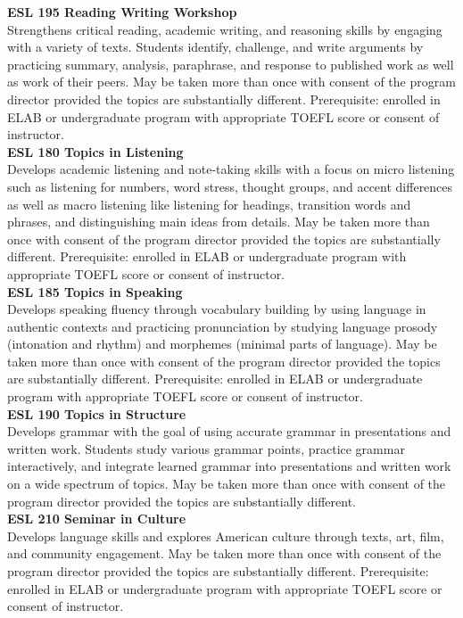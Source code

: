 \documentclass[
  letterpaper,
]{scrbook}
\begin{document}
\textbf{ESL 195 Reading Writing Workshop}\\
Strengthens critical reading, academic writing, and reasoning skills by
engaging with a variety of texts. Students identify, challenge, and
write arguments by practicing summary, analysis, paraphrase, and
response to published work as well as work of their peers. May be taken
more than once with consent of the program director provided the topics
are substantially different. Prerequisite: enrolled in ELAB or
undergraduate program with appropriate TOEFL score or consent of
instructor.\\
\textbf{ESL 180 Topics in Listening}\\
Develops academic listening and note-taking skills with a focus on micro
listening such as listening for numbers, word stress, thought groups,
and accent differences as well as macro listening like listening for
headings, transition words and phrases, and distinguishing main ideas
from details. May be taken more than once with consent of the program
director provided the topics are substantially different. Prerequisite:
enrolled in ELAB or undergraduate program with appropriate TOEFL score
or consent of instructor.\\
\textbf{ESL 185 Topics in Speaking}\\
Develops speaking fluency through vocabulary building by using language
in authentic contexts and practicing pronunciation by studying language
prosody (intonation and rhythm) and morphemes (minimal parts of
language). May be taken more than once with consent of the program
director provided the topics are substantially different. Prerequisite:
enrolled in ELAB or undergraduate program with appropriate TOEFL score
or consent of instructor.\\
\textbf{ESL 190 Topics in Structure}\\
Develops grammar with the goal of using accurate grammar in
presentations and written work. Students study various grammar points,
practice grammar interactively, and integrate learned grammar into
presentations and written work on a wide spectrum of topics. May be
taken more than once with consent of the program director provided the
topics are substantially different.\\
\textbf{ESL 210 Seminar in Culture}\\
Develops language skills and explores American culture through texts,
art, film, and community engagement. May be taken more than once with
consent of the program director provided the topics are substantially
different. Prerequisite: enrolled in ELAB or undergraduate program with
appropriate TOEFL score or consent of instructor.
\end{document}
